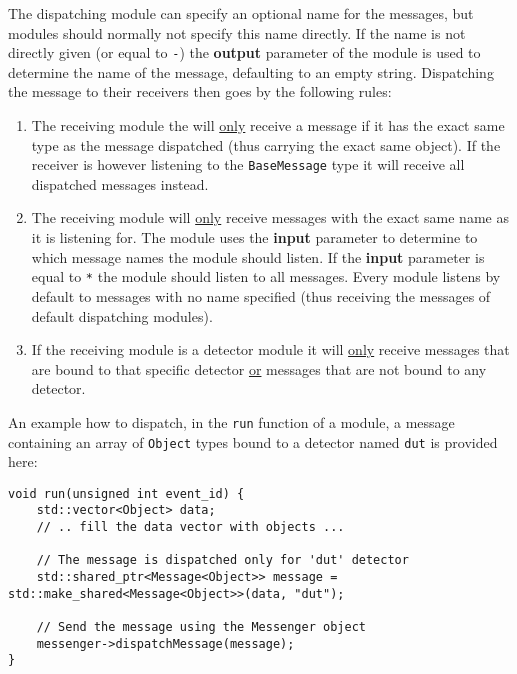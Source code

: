 The dispatching module can specify an optional name for the messages, but modules should normally not specify this name directly. If the name is not directly given (or equal to \texttt{-}) the \textbf{output} parameter of the module is used to determine the name of the message, defaulting to an empty string. Dispatching the message to their receivers then goes by the following rules:
\begin{enumerate}
\item The receiving module the will \underline{only} receive a message if it has the exact same type as the message dispatched (thus carrying the exact same object). If the receiver is however listening to the \texttt{BaseMessage} type it will receive all dispatched messages instead.
\item The receiving module will \underline{only} receive messages with the exact same name as it is listening for. The module uses the \textbf{input} parameter to determine to which message names the module should listen. If the \textbf{input} parameter is equal to \texttt{*} the module should listen to all messages. Every module listens by default to messages with no name specified (thus receiving the messages of default dispatching modules).
\item If the receiving module is a detector module it will \underline{only} receive messages that are bound to that specific detector \underline{or} messages that are not bound to any detector.
\end{enumerate}

An example how to dispatch, in the \texttt{run} function of a module, a message containing an array of \texttt{Object} types bound to a detector named \texttt{dut} is provided here:
\begin{verbatim}
void run(unsigned int event_id) {
    std::vector<Object> data;
    // .. fill the data vector with objects ...
    
    // The message is dispatched only for 'dut' detector
    std::shared_ptr<Message<Object>> message = std::make_shared<Message<Object>>(data, "dut");
    
    // Send the message using the Messenger object
    messenger->dispatchMessage(message);
}
\end{verbatim}

